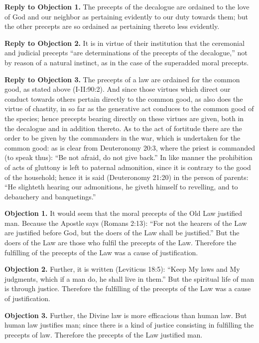 \textbf{Reply to Objection 1.} The precepts of the decalogue are ordained to the love of God and our neighbor as pertaining evidently to our duty towards them; but the other precepts are so ordained as pertaining thereto less evidently.

\textbf{Reply to Objection 2.} It is in virtue of their institution that the ceremonial and judicial precepts ``are determinations of the precepts of the decalogue,'' not by reason of a natural instinct, as in the case of the superadded moral precepts.

\textbf{Reply to Objection 3.} The precepts of a law are ordained for the common good, as stated above (I-II:90:2). And since those virtues which direct our conduct towards others pertain directly to the common good, as also does the virtue of chastity, in so far as the generative act conduces to the common good of the species; hence precepts bearing directly on these virtues are given, both in the decalogue and in addition thereto. As to the act of fortitude there are the order to be given by the commanders in the war, which is undertaken for the common good: as is clear from Deuteronomy 20:3, where the priest is commanded (to speak thus): ``Be not afraid, do not give back.'' In like manner the prohibition of acts of gluttony is left to paternal admonition, since it is contrary to the good of the household; hence it is said (Deuteronomy 21:20) in the person of parents: ``He slighteth hearing our admonitions, he giveth himself to revelling, and to debauchery and banquetings.''


\textbf{Objection 1.} It would seem that the moral precepts of the Old Law justified man. Because the Apostle says (Romans 2:13): ``For not the hearers of the Law are justified before God, but the doers of the Law shall be justified.'' But the doers of the Law are those who fulfil the precepts of the Law. Therefore the fulfilling of the precepts of the Law was a cause of justification.

\textbf{Objection 2.} Further, it is written (Leviticus 18:5): ``Keep My laws and My judgments, which if a man do, he shall live in them.'' But the spiritual life of man is through justice. Therefore the fulfilling of the precepts of the Law was a cause of justification.

\textbf{Objection 3.} Further, the Divine law is more efficacious than human law. But human law justifies man; since there is a kind of justice consisting in fulfilling the precepts of law. Therefore the precepts of the Law justified man.

